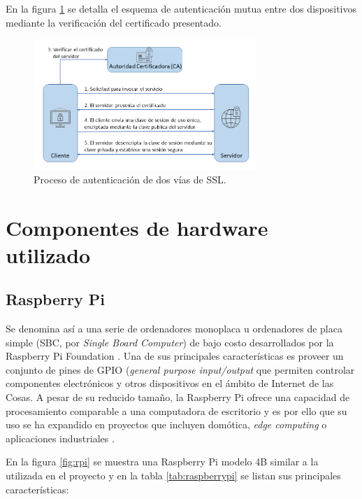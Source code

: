 En la figura \ref{fig:ssl2way} se detalla el esquema de autenticación mutua entre dos dispositivos mediante la verificación del certificado presentado.

\begin{figure}[h]
	\centering
	\includegraphics[width=0.75\textwidth]{./Figures/tls.png}
	\caption[Proceso de autenticación de dos vías de SSL.]{Proceso de autenticación de dos vías de SSL\protect\footnotemark.}
	\label{fig:ssl2way}

\end{figure}
	
\section{Componentes de hardware utilizado}
\label{sec:Hardware utilizado}

\subsection{Raspberry Pi}
\label{sec:Raspberry Pi}
Se denomina así a una serie de ordenadores monoplaca u ordenadores de placa simple (SBC, por \textit{Single Board Computer}) de bajo costo desarrollados por la Raspberry Pi Foundation \citep{raspberrypi:1}.
Una de sus principales características es proveer un conjunto de pines de GPIO (\textit{general purpose input/output} que permiten controlar componentes electrónicos y otros dispositivos en el ámbito de Internet de las Cosas.
A pesar de su reducido tamaño, la Raspberry Pi ofrece una capacidad de procesamiento comparable a una computadora de escritorio y es por ello que su uso se ha expandido en proyectos que incluyen domótica, \textit{edge computing} o aplicaciones industriales \citep{raspberrypi:2}. 

En la figura \ref{fig:rpi} se muestra una Raspberry Pi modelo 4B similar a la utilizada en el proyecto y en la tabla \ref{tab:raspberrypi} se listan sus principales características: 
 
